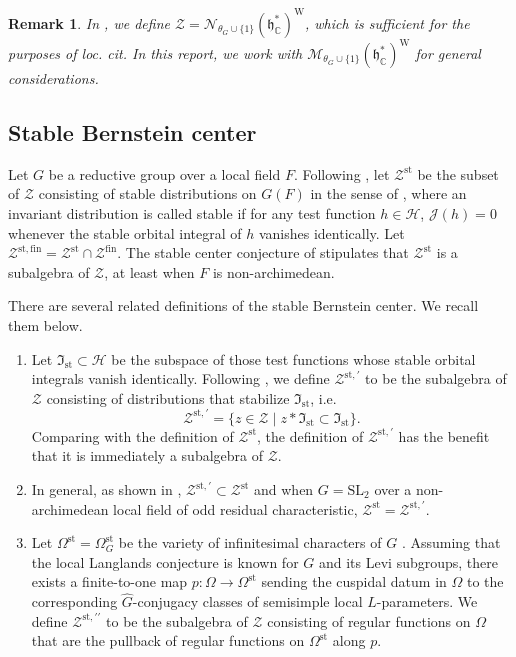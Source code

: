 \documentclass[iccmp]{ipbook}
\newcommand{\BC}{{\mathbb {C}}}
\newcommand{\CH}{{\mathcal {H}}}
\newcommand{\CJ}{{\mathcal {J}}}
\newcommand{\CM}{{\mathcal {M}}}
\newcommand{\CN}{{\mathcal {N}}}
\newcommand{\CZ}{{\mathcal {Z}}}
\newcommand{\FI}{{\mathfrak {I}}}
\newcommand{\Fh}{{\mathfrak {h}}}
\newcommand{\RW}{{\mathrm {W}}}
\newcommand{\SL}{{\mathrm{SL}}}
\newcommand{\st}{{\mathrm{st}}}
\newcommand{\wh}{\widehat}
\def\Ome{{\Omega}}
\newcommand{\fin}{\mathrm{fin}}
\def\p{\prime}
\newtheorem{rmk}[thm]{Remark}
\newenvironment{num}{\begin{enumerate}}{\end{enumerate}}
\begin{document}
\begin{rmk}\label{rmk:defin:Schwartz-multiplier}
In \cite{LN}, we define $\CZ = \CN_{\theta_G\cup\{1\}}(\Fh^*_\BC)^\RW$, which is sufficient for the purposes of \emph{loc. cit.} In this report, we work with $\CM_{\theta_G\cup \{1\}}(\Fh^*_\BC)^\RW$ for general considerations.
\end{rmk}

\subsection{Stable Bernstein center}\label{subsec:SBC}

Let $G$ be a reductive group over a local field $F$. Following \cite{bezrukavnikov2013categorical}, let $\CZ^\st$ be the subset of $\CZ$ consisting of stable distributions on $G(F)$ in the sense of \cite{MR0540901}, where an invariant distribution is called stable if for any test function $h\in \CH$, $\CJ(h)= 0$ whenever the stable orbital integral of $h$ vanishes identically. Let $\CZ^{\st,\fin} = \CZ^\st\cap \CZ^\fin$. The stable center conjecture of \cite{bezrukavnikov2013categorical} stipulates that $\CZ^\st$ is a subalgebra of $\CZ$, at least when $F$ is non-archimedean.


There are several related definitions of the stable Bernstein center. We recall them below.

\begin{num}
\item Let $\FI_\st\subset \CH$ be the subspace of those test functions whose stable orbital integrals vanish identically. Following \cite{MR2983012}, we define $\CZ^{\st,\p}$ to be the subalgebra of $\CZ$ consisting of distributions that stabilize $\FI_\st$, i.e.
$$
\CZ^{\st,\p} = \{z\in \CZ\mid z*\FI_\st\subset \FI_\st\}.
$$
Comparing with the definition of $\CZ^\st$, the definition of $\CZ^{\st,\p}$ has the benefit that it is immediately a subalgebra of $\CZ$.

\item In general, as shown in \cite[Prop.~3.5.3]{LN}, $\CZ^{\st,\p}\subset \CZ^\st$ and when $G=\SL_2$ over a non-archimedean local field of odd residual characteristic, $\CZ^\st = \CZ^{\st,\p}$.

\item Let $\Ome^\st = \Ome^\st_G$ be the variety of infinitesimal characters of $G$ \cite[\S 5]{MR3444233}\cite[\S 6]{MR2983012}. Assuming that the local Langlands conjecture is known for $G$ and its Levi subgroups, there exists a finite-to-one map $p:\Ome\to\Ome^\st$ sending the cuspidal datum in $\Ome$ to the corresponding $\wh{G}$-conjugacy classes of semisimple local $L$-parameters. We define $\CZ^{\st,\p\p}$ to be the subalgebra of $\CZ$ consisting of regular functions on $\Ome$ that are the pullback of regular functions on $\Ome^\st$ along $p$.
\end{num}
\end{document}
